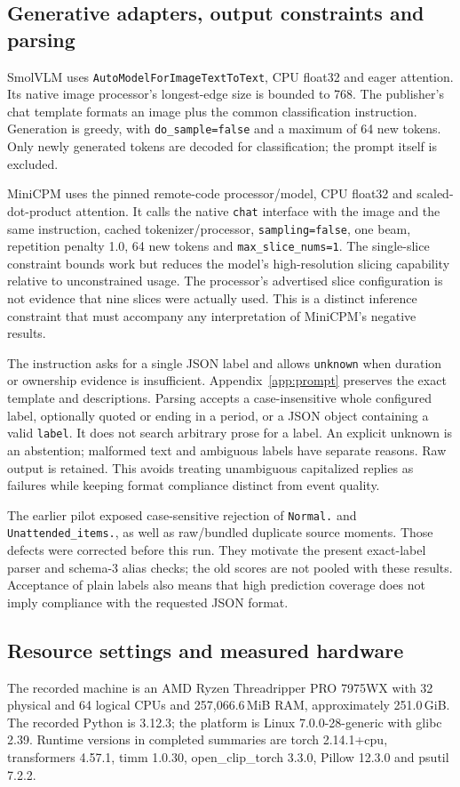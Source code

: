 \documentclass[11pt,a4paper]{article}
\newcommand{\code}[1]{\nolinkurl{#1}}
\begin{document}
\subsection{Generative adapters, output constraints and parsing}
SmolVLM uses \code{AutoModelForImageTextToText}, CPU float32 and eager attention. Its native image processor's longest-edge size is bounded to 768. The publisher's chat template formats an image plus the common classification instruction. Generation is greedy, with \code{do_sample=false} and a maximum of 64 new tokens. Only newly generated tokens are decoded for classification; the prompt itself is excluded.

MiniCPM uses the pinned remote-code processor/model, CPU float32 and scaled-dot-product attention. It calls the native \code{chat} interface with the image and the same instruction, cached tokenizer/processor, \code{sampling=false}, one beam, repetition penalty 1.0, 64 new tokens and \code{max_slice_nums=1}. The single-slice constraint bounds work but reduces the model's high-resolution slicing capability relative to unconstrained usage. The processor's advertised slice configuration is not evidence that nine slices were actually used. This is a distinct inference constraint that must accompany any interpretation of MiniCPM's negative results.

The instruction asks for a single JSON label and allows \code{unknown} when duration or ownership evidence is insufficient. Appendix~\ref{app:prompt} preserves the exact template and descriptions. Parsing accepts a case-insensitive whole configured label, optionally quoted or ending in a period, or a JSON object containing a valid \code{label}. It does not search arbitrary prose for a label. An explicit unknown is an abstention; malformed text and ambiguous labels have separate reasons. Raw output is retained. This avoids treating unambiguous capitalized replies as failures while keeping format compliance distinct from event quality.

The earlier pilot exposed case-sensitive rejection of \code{Normal.} and \code{Unattended_items.}, as well as raw/bundled duplicate source moments. Those defects were corrected before this run. They motivate the present exact-label parser and schema-3 alias checks; the old scores are not pooled with these results. Acceptance of plain labels also means that high prediction coverage does not imply compliance with the requested JSON format.

\subsection{Resource settings and measured hardware}
The recorded machine is an AMD Ryzen Threadripper PRO 7975WX with 32 physical and 64 logical CPUs and 257,066.6\,MiB RAM, approximately 251.0\,GiB. The recorded Python is 3.12.3; the platform is Linux 7.0.0-28-generic with glibc 2.39. Runtime versions in completed summaries are torch 2.14.1+cpu, transformers 4.57.1, timm 1.0.30, open\_clip\_torch 3.3.0, Pillow 12.3.0 and psutil 7.2.2.
\end{document}
